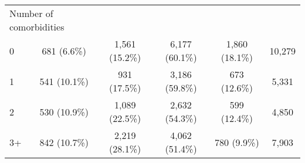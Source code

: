 \begin{longtable}[t]{lccccc}
\multicolumn{2}{l}{Number of comorbidities}  &  &  &  & \\
\hspace{1em}0 & 681 (6.6\%) & 1,561 (15.2\%) & 6,177 (60.1\%) & 1,860 (18.1\%) & 10,279\\
\hspace{1em}1 & 541 (10.1\%) & 931 (17.5\%) & 3,186 (59.8\%) & 673 (12.6\%) & 5,331\\
\hspace{1em}2 & 530 (10.9\%) & 1,089 (22.5\%) & 2,632 (54.3\%) & 599 (12.4\%) & 4,850\\
\hspace{1em}3+ & 842 (10.7\%) & 2,219 (28.1\%) & 4,062 (51.4\%) & 780 (9.9\%) & 7,903\\
\bottomrule
\end{longtable}
